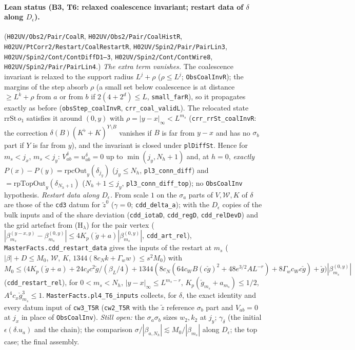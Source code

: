 \documentclass[11pt]{amsart}
\theoremstyle{definition}
\theoremstyle{remark}
\numberwithin{equation}{section}
\begin{document}
\paragraph{Lean status (B3, T6: relaxed coalescence invariant; restart data of $\delta$ along $D_\epsilon$).}
(\texttt{H02UV/Obs2/Pair/CoalR}, \texttt{H02UV/Obs2/Pair/CoalHistR}, \texttt{H02UV/PtCorr2/Restart/CoalRestartR}, \texttt{H02UV/Spin2/Pair/PairLin3},
\texttt{H02UV/Spin2/Cont/ContDiffD1--3}, \texttt{H02UV/Spin2/Cont/ContWire8}, \texttt{H02UV/Spin2/Pair/PairLin4}.) \emph{The extra term vanishes.} The
coalescence invariant is relaxed to the support radius $L^j+\rho$ ($\rho\le L^j$; \texttt{ObsCoalInvR}); the margins of
the step absorb $\rho$ (a small set below coalescence is at distance $\ge L^k+\rho$ from $a$ or from $b$ if
$2(4+2^d)\le L$, \texttt{small\_farR}), so it propagates exactly as before (\texttt{obsStep\_coalInvR},
\texttt{crr\_coal\_validL}). The relocated state $\mathrm{rrSt}\,o_1$ satisfies it around $(0,y)$ with
$\rho=|y-x|_\infty<L^{m_s}$ (\texttt{crr\_rrSt\_coalInvR}: the correction $\delta(B)(K^\flat+K)^{Y\setminus B}$ vanishes if
$B$ is far from $y-x$ and has no $\sigma_b$ part if $Y$ is far from $y$), and the invariant is closed under
\texttt{plDiffSt}. Hence for $m_s<j_x$, $m_s<j_y$: $V^\delta_{ab}=u^\delta_{ab}=0$ up to $\min(j_y,N_h+1)$ and, at $h=0$,
\emph{exactly} $P(x)-P(y)=\mathrm{rpcOut}_y(\delta_{j_y})$ ($j_y\le N_h$, \texttt{pl3\_conn\_diff}) and
$=\mathrm{rpTopOut}_y(\delta_{N_h+1})$ ($N_h+1\le j_y$, \texttt{pl3\_conn\_diff\_top}); no \texttt{ObsCoalInv} hypothesis.
\emph{Restart data along $D_\epsilon$.} From scale $1$ on the $\sigma_a$ parts of $V,\mathcal W,K$ of $\delta$ are those of the
\texttt{cd3} datum for $\tilde z^0$ ($\gamma=0$; \texttt{cdd\_delta\_a}); with the $D_\epsilon$ copies of the bulk inputs
and of the share deviation (\texttt{cdd\_iotaD}, \texttt{cdd\_regD}, \texttt{cdd\_relDevD}) and the grid artefact from
(H$_\lambda$) for the pair vertex ($|\beta^{(y-x,y)}_{m_s}-\beta^{(0,y)}_{m_s}|\le4K_p(\check g+a)|\beta^{(0,y)}_{m_s}|$,
\texttt{cdd\_art\_rel}), \texttt{MasterFacts.cdd\_restart\_data} gives the inputs of the restart at $m_s$
($|\beta|+D\le M_0$, $\mathcal W$, $K$, $1344(8c_Nk+\Gamma_ww)\le s^2M_0$) with
$M_0\le\bigl(4K_p(\check g+a)+24c_\delta c^2\check g/(\beta_L/4)+1344(8c_N(64c_WB(c\check g)^2+48e^{3/2}A L^{-r})
+8\Gamma_wc_Wc\check g)+\check g\bigr)|\beta^{(0,y)}_{m_s}|$ (\texttt{cdd\_restart\_rel}), for $0<m_s<N_h$,
$|y-x|_\infty\le L^{m_s-r}$, $K_p(\check g_{m_s}+a_{m_s})\le1/2$, $A^4c_x\check g_{m_s}^3\le1$.
\texttt{MasterFacts.pl4\_T6\_inputs} collects, for $\delta$, the exact identity and every datum input of
\texttt{cw3\_T5R} (\texttt{cw2\_T5R} with the $\tilde z$ reference $\sigma_b$ part and $V_{ab}=0$ at $j_x$ in place of
\texttt{ObsCoalInv}). \emph{Still open:} the $\sigma_a\sigma_b$ sizes $w_2,k_2$ at $j_y$; $\gamma_\delta$ (the initial
$\epsilon(\delta.u_a)$ and the chain); the comparison $\sigma/|\beta_{a,N_h}|\lesssim M_0/|\beta_{m_s}|$ along $D_\epsilon$; the
top case; the final assembly.
\end{document}
